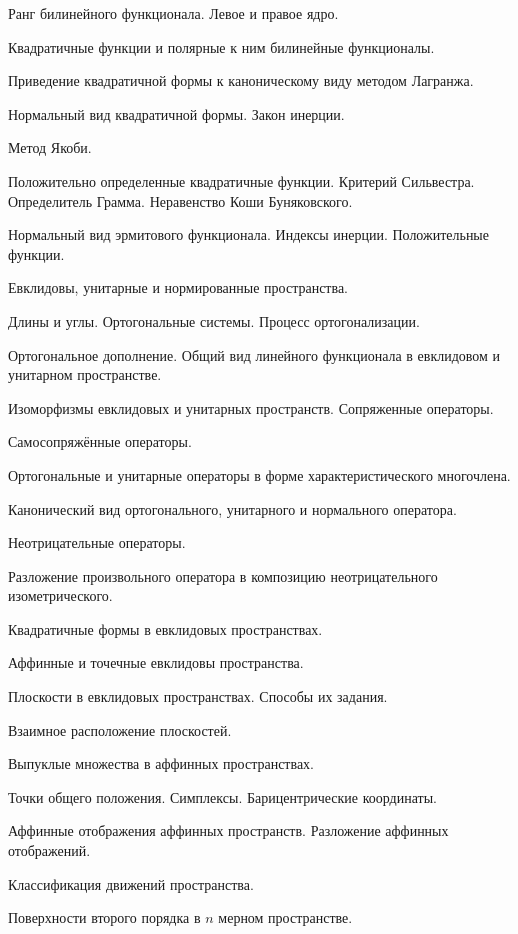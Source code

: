 \documentclass[a4paper]{article}
\begin{document}
\begin{nums}{-1}
\item Ранг билинейного функционала. Левое и правое ядро.
\item Квадратичные функции и полярные к ним билинейные функционалы.
\item Приведение квадратичной формы к каноническому виду методом Лагранжа.
\item Нормальный вид квадратичной формы. Закон инерции.
\item Метод Якоби.
\item Положительно определенные квадратичные функции. Критерий Сильвестра. Определитель Грамма. Неравенство Коши Буняковского.
\item Нормальный вид эрмитового функционала. Индексы инерции. Положительные функции.
\item Евклидовы, унитарные и нормированные пространства.
\item Длины и углы. Ортогональные системы. Процесс ортогонализации.
\item Ортогональное дополнение. Общий вид линейного функционала в евклидовом и унитарном пространстве.
\item Изоморфизмы евклидовых и унитарных пространств. Сопряженные операторы.
\item Самосопряжённые операторы.
\item Ортогональные и унитарные операторы в форме характеристического многочлена.
\item Канонический вид ортогонального, унитарного и нормального оператора.
\item Неотрицательные операторы.
\item Разложение произвольного оператора в композицию неотрицательного  изометрического.
\item Квадратичные формы в евклидовых пространствах.
\item Аффинные и точечные евклидовы пространства.
\item Плоскости в евклидовых пространствах. Способы их задания.
\item Взаимное расположение плоскостей.
\item Выпуклые множества в аффинных пространствах.
\item Точки общего положения. Симплексы. Барицентрические координаты.
\item Аффинные отображения аффинных пространств. Разложение аффинных отображений.
\item Классификация движений пространства.
\item Поверхности второго порядка в $n$ мерном пространстве.

\end{nums}
\end{document}
